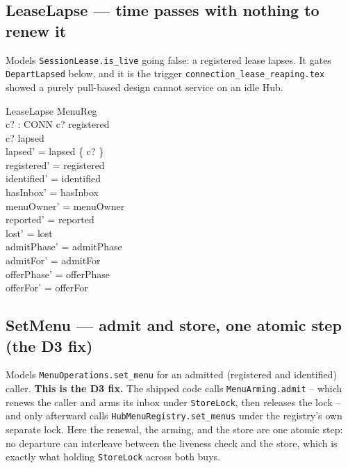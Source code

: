 \documentclass[a4paper,10pt,fleqn]{article}
\begin{document}
\subsection{LeaseLapse --- time passes with nothing to renew it}

Models \texttt{SessionLease.is\_live} going false: a registered lease
lapses. It gates \texttt{DepartLapsed} below, and it is the trigger
\texttt{connection\_lease\_reaping.tex} showed a purely pull-based design
cannot service on an idle Hub.

\begin{schema}{LeaseLapse}
  \Delta MenuReg \\
  c? : CONN
\where
  c? \in registered \\
  c? \notin lapsed \\
  lapsed' = lapsed \cup \{ c? \} \\
  registered' = registered \\
  identified' = identified \\
  hasInbox' = hasInbox \\
  menuOwner' = menuOwner \\
  reported' = reported \\
  lost' = lost \\
  admitPhase' = admitPhase \\
  admitFor' = admitFor \\
  offerPhase' = offerPhase \\
  offerFor' = offerFor
\end{schema}

\subsection{SetMenu --- admit and store, one atomic step (the D3 fix)}
\label{sec:setmenu}

Models \texttt{MenuOperations.set\_menu} for an admitted (registered and
identified) caller. \textbf{This is the D3 fix.} The shipped code calls
\texttt{MenuArming.admit} -- which renews the caller and arms its inbox under
\texttt{StoreLock}, then releases the lock -- and only afterward calls
\texttt{HubMenuRegistry.set\_menus} under the registry's own separate lock.
Here the renewal, the arming, and the store are one atomic step: no
departure can interleave between the liveness check and the store, which is
exactly what holding \texttt{StoreLock} across both buys.
\end{document}
